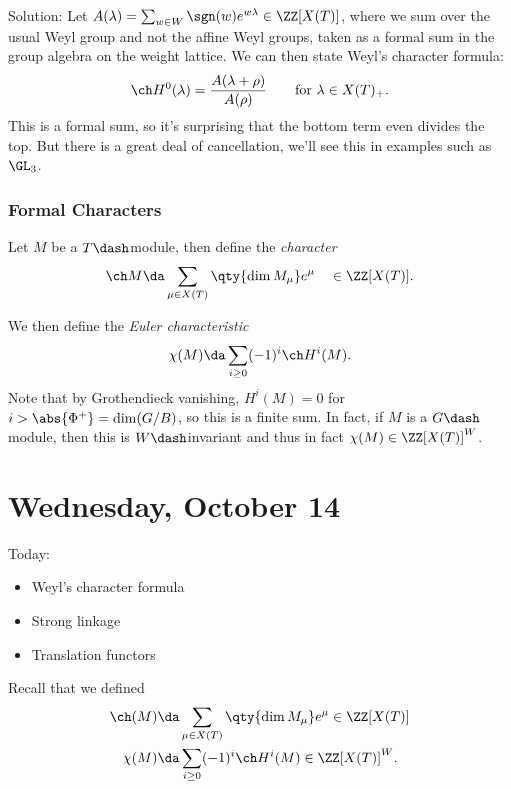 Solution: Let
\(A(\lambda) = \sum_{w\in W} \sgn(w) e^{w\lambda} \in \ZZ[X(T)]\), where
we sum over the usual Weyl group and not the affine Weyl groups, taken
as a formal sum in the group algebra on the weight lattice. We can then
state Weyl's character formula:
\begin{align*}  
\ch H^0(\lambda) = {A(\lambda + \rho) \over A(\rho)} \qquad \text{for }\lambda \in X(T)_+
.\end{align*} This is a formal sum, so it's surprising that the bottom
term even divides the top. But there is a great deal of cancellation,
we'll see this in examples such as \(\GL_3\).

\hypertarget{formal-characters}{%
\subsubsection{Formal Characters}\label{formal-characters}}

Let \(M\) be a \(T\dash\)module, then define the \emph{character}
\begin{align*}  
\ch M\da \sum_{\mu\in X(T)} \qty{\dim M_\mu} e^\mu \quad \in \ZZ[X(T)]
.\end{align*}

We then define the \emph{Euler characteristic}
\begin{align*}  
\chi(M) \da \sum_{i\geq 0} (-1)^i \ch H^i(M)
.\end{align*} Note that by Grothendieck vanishing, \(H^i(M) = 0\) for
\(i > \abs{\Phi^+} = \dim(G/B)\), so this is a finite sum. In fact, if
\(M\) is a \(G\dash\)module, then this is \(W\dash\)invariant and thus
in fact \(\chi(M) \in \ZZ[X(T)]^W\).

\hypertarget{wednesday-october-14}{%
\section{Wednesday, October 14}\label{wednesday-october-14}}

Today:

\begin{itemize}
\item
  Weyl's character formula
\item
  Strong linkage
\item
  Translation functors
\end{itemize}

Recall that we defined
\begin{align*}  
\ch(M) &\da \sum_{\mu \in X(T)} \qty{\dim M_\mu} e^{\mu} \in \ZZ[X(T)]\\
\chi(M) &\da \sum_{i\geq 0} (-1)^i \ch H^i(M) \in \ZZ[X(T)]^W
.\end{align*}

